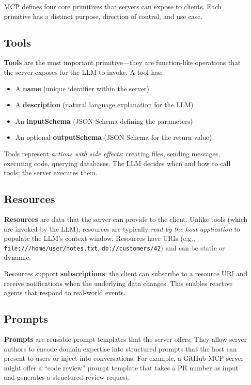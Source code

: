 MCP defines four core primitives that servers can expose to clients. Each primitive has a distinct purpose, direction of control, and use case.

\subsection{Tools}
\label{tools}

\textbf{Tools} are the most important primitive---they are function-like operations that the server exposes for the LLM to invoke. A tool has:

\begin{itemize}
  \item A \textbf{name} (unique identifier within the server)
  \item A \textbf{description} (natural language explanation for the LLM)
  \item An \textbf{inputSchema} (JSON Schema defining the parameters)
  \item An optional \textbf{outputSchema} (JSON Schema for the return value)
\end{itemize}

Tools represent \emph{actions with side effects}: creating files, sending messages, executing code, querying databases. The LLM decides when and how to call tools; the server executes them.

\subsection{Resources}
\label{resources}

\textbf{Resources} are data that the server can provide to the client. Unlike tools (which are invoked by the LLM), resources are typically \emph{read by the host application} to populate the LLM’s context window. Resources have URIs (e.g., \texttt{file:///home/user/notes.txt}, \texttt{db://customers/42}) and can be static or dynamic.

Resources support \textbf{subscriptions}: the client can subscribe to a resource URI and receive notifications when the underlying data changes. This enables reactive agents that respond to real-world events.

\subsection{Prompts}
\label{prompts}

\textbf{Prompts} are reusable prompt templates that the server offers. They allow server authors to encode domain expertise into structured prompts that the host can present to users or inject into conversations. For example, a GitHub MCP server might offer a ``code review'' prompt template that takes a PR number as input and generates a structured review request.

